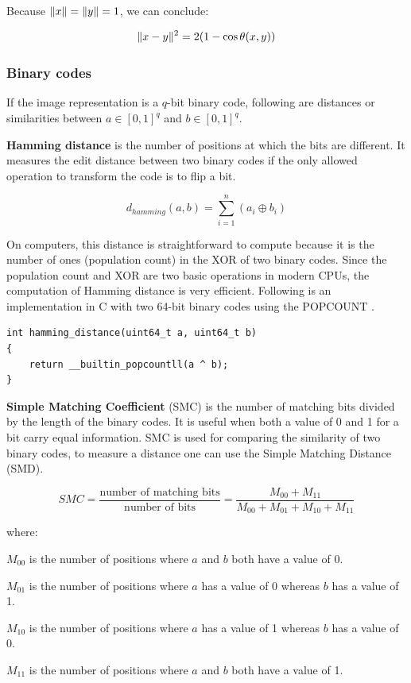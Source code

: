Because $\lVert x\rVert=\lVert y\rVert=1$, we can conclude: 

\[\lVert x-y\rVert^2=2(1-\cos{\theta{(x, y)}})\]

\subsubsection{Binary codes}
If the image representation is a $q$-bit binary code, following are distances or similarities between $a\in[0, 1]^{q}$ and $b\in[0, 1]^{q}$.

\textbf{Hamming distance} is the number of positions at which the bits are different. It measures the edit distance between two binary codes if the only allowed operation to transform the code is to flip a bit.

\[d_{hamming}(a, b) = \sum_{i=1}^{n} (a_i \oplus b_i)\]

On computers, this distance is straightforward to compute because it is the number of ones (population count) in the XOR of two binary codes. Since the population count and XOR are two basic operations in modern CPUs, the computation of Hamming distance is very efficient. Following is an implementation in C with two 64-bit binary codes using the POPCOUNT .

\lstset{language=C}
\begin{lstlisting}
int hamming_distance(uint64_t a, uint64_t b)
{
    return __builtin_popcountll(a ^ b);
}
\end{lstlisting}

\textbf{Simple Matching Coefficient} (SMC) is the number of matching bits divided by the length of the binary codes. It is useful when both a value of 0 and 1 for a bit carry equal information. SMC is used for comparing the similarity of two binary codes, to measure a distance one can use the Simple Matching Distance (SMD).

\[SMC=\frac{\text{number of matching bits}}{\text{number of bits}}=\frac{M_{00}+M_{11}}{M_{00}+M_{01}+M_{10}+M_{11}}\]

where:

\begin{description}
\item\textbf{$M_{00}$} is the number of positions where $a$ and $b$ both have a value of 0.
\item\textbf{$M_{01}$} is the number of positions where $a$ has a value of 0 whereas $b$ has a value of 1.
\item\textbf{$M_{10}$} is the number of positions where $a$ has a value of 1 whereas $b$ has a value of 0.
\item\textbf{$M_{11}$} is the number of positions where $a$ and $b$ both have a value of 1.
\end{description}

